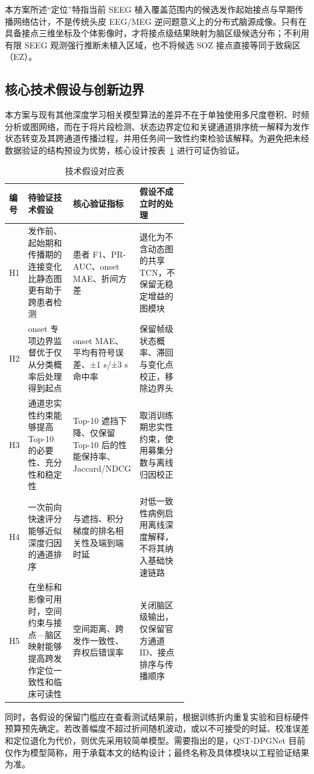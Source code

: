 \documentclass{cumcmthesis}
\numberwithin{figure}{section} %
\numberwithin{table}{section} %
\begin{document}
本方案所述“定位”特指当前 SEEG 植入覆盖范围内的候选发作起始接点与早期传播网络估计，不是传统头皮 EEG/MEG 逆问题意义上的分布式脑源成像。只有在具备接点三维坐标及个体影像时，才将接点级结果映射为脑区级候选分布；不利用有限 SEEG 观测强行推断未植入区域，也不将候选 SOZ 接点直接等同于致痫区（EZ）。


\subsection{核心技术假设与创新边界}
本方案与现有其他深度学习相关模型算法的差异不在于单独使用多尺度卷积、时频分析或图网络，而在于将片段检测、状态边界定位和关键通道排序统一解释为发作状态转变及其跨通道传播过程，并用任务间一致性约束检验该解释。为避免把未经数据验证的结构预设为优势，核心设计按表~\ref{tab:technical-hypotheses} 进行可证伪验证。

\begin{table}[htbp]
	\centering
	\caption{技术假设对应表}
    \label{tab:technical-hypotheses}
    \renewcommand{\arraystretch}{1.5}
    \setlength{\tabcolsep}{4pt}
    \begin{tabularx}{\linewidth}{@{}
        p{0.06\linewidth}
        p{0.25\linewidth}
        p{0.28\linewidth}
        X
    @{}}

		\toprule[1pt]
		\textbf{编号	} & \textbf{	待验证技术假设} & \textbf{核心验证指标} & \textbf{假设不成立时的处理}\\
		\midrule
		H1	&发作前、起始期和传播期的连接变化比静态图更有助于跨患者检测	&患者 F1、PR-AUC、onset MAE、折间方差	&退化为不含动态图的共享 TCN，不保留无稳定增益的图模块\\
		H2	&onset 专项边界监督优于仅从分类概率后处理得到起点	&onset MAE、平均有符号误差、±1 s/±3 s 命中率&保留帧级状态概率、滞回与变化点校正，移除边界头\\
        H3	&通道忠实性约束能够提高 Top-10 的必要性、充分性和稳定性	&Top-10 遮挡下降、仅保留 Top-10 后的性能保持率、Jaccard/NDCG	&	取消训练期忠实性约束，使用募集分数与离线归因校正\\
        H4	&一次前向快速评分能够近似深度归因的通道排序	&与遮挡、积分梯度的排名相关性及端到端时延&	对低一致性病例启用离线深度解释，不将其纳入基础快速链路\\
        H5	&在坐标和影像可用时，空间约束与接点—脑区映射能够提高跨发作定位一致性和临床可读性	&空间距离、跨发作一致性、弃权后错误率	&关闭脑区级输出，仅保留官方通道 ID、接点排序与传播顺序\\

		\bottomrule[1pt]
	\end{tabularx}
\end{table}
同时，各假设的保留门槛应在查看测试结果前，根据训练折内重复实验和目标硬件预算预先确定。若改善幅度不超过折间随机波动，或以不可接受的时延、校准误差和定位退化为代价，则优先采用较简单模型。需要指出的是，QST-DPGNet 目前仅作为模型简称，用于承载本文的结构设计；最终名称及具体模块以工程验证结果为准。
\end{document}
